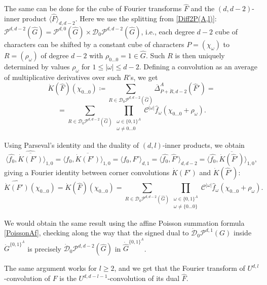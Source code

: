 \documentclass{amsart}
\theoremstyle{definition}
\theoremstyle{remark}
\numberwithin{equation}{section}
\begin{document}
The same can be done for the cube of Fourier transforms $\hat{F}$ and the $(d,d-2)$-inner product $\langle \hat{F} \rangle_{d,d-2}$. Here we use the splitting  from \eqref{Diff2P(A,l)}: $\mathcal{P}^{d,d-2}(\hat{G}) = \mathcal{P}^{d,0}(\hat{G}) \times \mathcal{D}_0\mathcal{P}^{d,d-2}(\hat{G})$, i.e., each degree $d-2$ cube of characters can be shifted by a constant cube of characters $P= (\chi_\omega)$ to $R=(\rho_\omega)$ of degree $d-2$ with $\rho_{0\dots0}=1 \in \hat{G}$. Such $R$ is then uniquely determined by values $\rho_\omega$ for $1\le |\omega|\le d-2$. Defining a convolution as an average of multiplicative derivatives over such $R$'s, we get
$$\dot{K}(\hat{F}) (\chi_{0\dots0}) \coloneqq  \sum_{R \in  \mathcal{D}_0\mathcal{P}^{d,d-2}(\hat{G})} \overline{\Delta}^A_{\dot{P}+\dot{R},d-2} (\hat{F}') = $$
$$ = \sum_{R \in  \mathcal{D}_0\mathcal{P}^{d,d-2}(\hat{G})} \prod_{\substack{\omega \in \{0,1\}^A \\ \omega \neq 0\dots0} } \mathcal{C}^{|\omega|} \hat{f}_\omega (\chi_{0\dots0} + \rho_\omega).$$

Using Parseval's identity and the duality of $(d,l)$-inner products, we obtain
$$ \langle \hat{f_0}, \widehat{\overline{\dot{K}(F')}} \rangle_{1,0} = \langle f_0, \overline{\dot{K}(F')} \rangle_{1,0} = \langle f_0, F' \rangle_{d,1}  = \langle \hat{f_0}, \hat{F}' \rangle_{d,d-2}  = \langle \hat{f_0}, \overline{\dot{K}(\hat{F}')} \rangle_{1,0},$$
giving a Fourier identity between corner convolutions $\dot{K}(F')$ and $\dot{K}(\hat{F}')$:
\begin{equation}
    \label{Corner}
    \widehat{\dot{K}(F')}   (\chi_{0\dots0}) = \dot{K}(\hat{F}) (\chi_{0\dots0}) =\sum_{R \in  \mathcal{D}_0\mathcal{P}^{d,d-2}(\hat{G})} \prod_{\substack{\omega \in \{0,1\}^A\\ \omega \neq  \{0\dots0\} }} \mathcal{C}^{|\omega|} \hat{f}_\omega (\chi_{0\dots0} + \rho_\omega).
\end{equation}

We would obtain the same result using the affine Poisson summation formula \eqref{PoissonAf}, checking along the way that the signed dual to $\dot{\mathcal{D}}_{0}\mathcal{P}^{d,1}(G)$ inside $\dot{G}^{\{0,1\}^A}$ is precisely $\dot{\mathcal{D}}_{0}\mathcal{P}^{d,d-2}(\hat{G})$ in $\dot{\hat{G}}^{\{0,1\}^A }$.

The same argument works for $l\ge 2$, and we get that the Fourier transform of $U^{d,l}$-convolution of $F$ is the $U^{d,d-l-1}$-convolution of its dual $\hat{F}$. 
\end{document}
